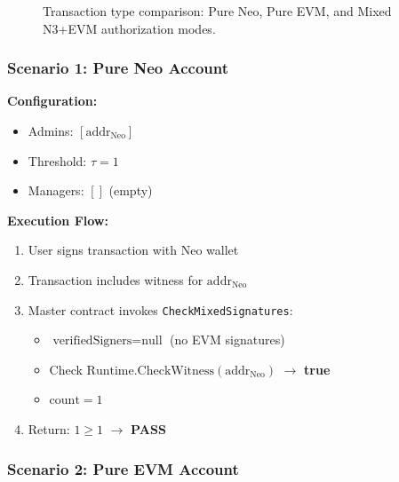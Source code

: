 \documentclass[10pt,twocolumn]{article}
\newcommand{\code}[1]{\texttt{\small #1}}
\begin{document}
{\begin{figure}[htbp]
\caption{Transaction type comparison: Pure Neo, Pure EVM, and Mixed N3+EVM authorization modes.}
\label{fig:transaction_comparison}
\end{figure}

\subsubsection{Scenario 1: Pure Neo Account}

\textbf{Configuration:}
\begin{itemize}[leftmargin=*,topsep=2pt,itemsep=1pt]
\item Admins: $[\text{addr}_{\text{Neo}}]$
\item Threshold: $\tau = 1$
\item Managers: $[]$ (empty)
\end{itemize}

\textbf{Execution Flow:}
\begin{enumerate}[leftmargin=*,topsep=2pt,itemsep=1pt]
\item User signs transaction with Neo wallet
\item Transaction includes witness for $\text{addr}_{\text{Neo}}$
\item Master contract invokes \code{CheckMixedSignatures}:
  \begin{itemize}[leftmargin=*,topsep=1pt,itemsep=0pt]
  \item $\text{verifiedSigners} = \text{null}$ (no EVM signatures)
  \item Check $\text{Runtime.CheckWitness}(\text{addr}_{\text{Neo}})$ $\rightarrow$ \textbf{true}
  \item $\text{count} = 1$
  \end{itemize}
\item Return: $1 \geq 1$ $\rightarrow$ \textbf{PASS}
\end{enumerate}

\subsubsection{Scenario 2: Pure EVM Account}

}
\end{document}
